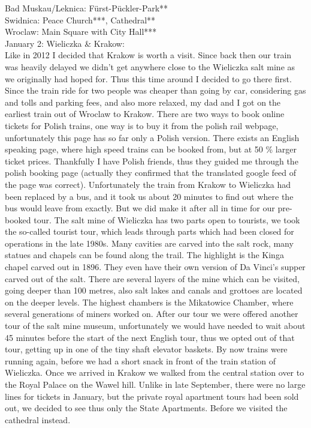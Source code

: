 Bad Muskau/Leknica: F\"urst-P\"uckler-Park**\\
Swidnica: Peace Church***, Cathedral**\\
Wroclaw: Main Square with City Hall***\\

January 2: Wieliczka \& Krakow:\\
Like in 2012 I decided that Krakow is worth a visit. Since back then our train was heavily delayed we didn't get anywhere close to the Wieliczka salt mine as we originally had hoped for. Thus this time around I decided to go there first. Since the train ride for two people was cheaper than going by car, considering gas and tolls and parking fees, and also more relaxed, my dad and I got on the earliest train out of Wroclaw to Krakow. There are two ways to book online tickets for Polish trains, one way is to buy it from the polish rail webpage, unfortunately this page has so far only a Polish version. There exists an English speaking page, where high speed trains can be booked from, but at 50 \% larger ticket prices. Thankfully I have Polish friends, thus they guided me through the polish booking page (actually they confirmed that the translated google feed of the page was correct). Unfortunately the train from Krakow to Wieliczka had been replaced by a bus, and it took us about 20 minutes to find out where the bus would leave from exactly. But we did make it after all in time for our pre-booked tour. The salt mine of Wieliczka has two parts open to tourists, we took the so-called tourist tour, which leads through parts which had been closed for operations in the late 1980s. Many cavities are carved into the salt rock, many statues and chapels can be found along the trail. The highlight is the Kinga chapel carved out in 1896. They even have their own version of Da Vinci's supper carved out of the salt. There are several layers of the mine which can be visited, going deeper than 100 metres, also salt lakes and canals and grottoes are located on the deeper levels. The highest chambers is the Mikatowice Chamber, where several generations of miners worked on. After our tour we were offered another tour of the salt mine museum, unfortunately we would have needed to wait about 45 minutes before the start of the next English tour, thus we opted out of that tour, getting up in one of the tiny shaft elevator baskets. By now trains were running again, before we had a short snack in front of the train station of Wieliczka. Once we arrived in Krakow we walked from the central station over to the Royal Palace on the Wawel hill. Unlike in late September, there were no large lines for tickets in January, but the private royal apartment tours had been sold out, we decided to see thus only the State Apartments. Before we visited the cathedral instead.\\

